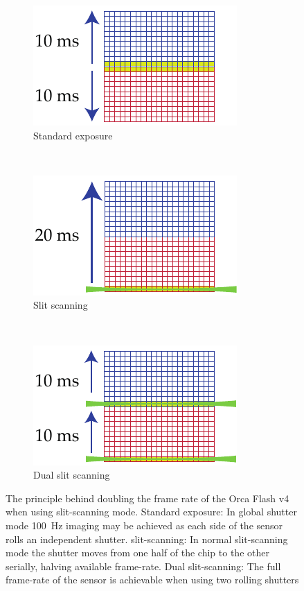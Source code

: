 \begin{figure}
  \centering
  \begin{subfigure}[t]{0.3\linewidth}
        \includegraphics{dual_slit_scanning/standard}
        \caption{Standard exposure}\label{fig:dual_slit_scanning/standard}
  \end{subfigure}~
  \begin{subfigure}[t]{0.3\linewidth}
        \includegraphics{dual_slit_scanning/single_slit}
        \caption{Slit scanning}\label{fig:dual_slit_scanning/single_slit}
  \end{subfigure}~
  \begin{subfigure}[t]{0.3\linewidth}
        \includegraphics{dual_slit_scanning/dual_slit}
        \caption{Dual slit scanning}\label{fig:dual_slit_scanning/dual_slit}
  \end{subfigure}
  \caption{
  The principle behind doubling the frame rate of the Orca Flash v4 when using \gls{slit-scanning} mode.
  Standard exposure: In global shutter mode \SI{100}{\hertz} imaging may be achieved as each side of the sensor rolls an independent shutter.
  \Gls{slit-scanning}: In normal \gls{slit-scanning} mode the shutter moves from one half of the chip to the other serially, halving available frame-rate.
  Dual \gls{slit-scanning}:
  The full frame-rate of the sensor is achievable when using two rolling shutters
  }
  \label{fig:dual_slit_scanning}
\end{figure}

